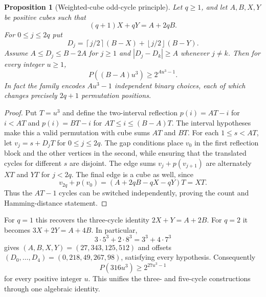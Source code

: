 \documentclass[10pt]{article}
\newtheorem{proposition}{Proposition}
\begin{document}
\begin{proposition}[Weighted-cube odd-cycle principle]
\label{prop:odd-cycle}
Let $q\ge1$, and let $A,B,X,Y$ be positive
cubes such that
\[
(q+1)X+qY=A+2qB.
\]
For $0\le j\le2q$ put
\[
D_j=\left\lceil j/2\right\rceil(B-X)
+\left\lfloor j/2\right\rfloor(B-Y).
\]
Assume $A\le D_j\le B-2A$ for $j\ge1$
and $|D_j-D_k|\ge A$ whenever $j\ne k$.
Then for every integer $u\ge1$,
\[
\boxed{P((B-A)u^3)\ge2^{Au^3-1}.}
\]
In fact the family encodes $Au^3-1$ independent
binary choices, each of which changes precisely
$2q+1$ permutation positions.
\end{proposition}
\begin{proof}
Put $T=u^3$ and define the two-interval
reflection $p(i)=AT-i$ for $i<AT$ and
$p(i)=BT-i$ for $AT\le i\le(B-A)T$.
The interval hypotheses make this a valid
permutation with cube sums $AT$ and $BT$.
For each $1\le s<AT$, let
$v_j=s+D_jT$ for $0\le j\le2q$.
The gap conditions place $v_0$ in the first
reflection block and the other vertices in
the second, while ensuring that the translated
cycles for different $s$ are disjoint.
The edge sums $v_j+p(v_{j+1})$ are
alternately $XT$ and $YT$ for $j<2q$.
The final edge is a cube as well, since
\[
v_{2q}+p(v_0)
=(A+2qB-qX-qY)T=XT.
\]
Thus the $AT-1$ cycles can be switched
independently, proving the count and
Hamming-distance statement.
\end{proof}

For $q=1$ this recovers the three-cycle
identity $2X+Y=A+2B$. For $q=2$ it
becomes $3X+2Y=A+4B$. In particular,
\[
3\cdot5^3+2\cdot8^3=3^3+4\cdot7^3
\]
gives $(A,B,X,Y)=(27,343,125,512)$
and offsets $(D_0,\ldots,D_4)
=(0,218,49,267,98)$, satisfying every
hypothesis. Consequently
\[
\boxed{P(316u^3)\ge2^{27u^3-1}}
\]
for every positive integer $u$.
This unifies the three- and five-cycle
constructions through one algebraic identity.
\end{document}
